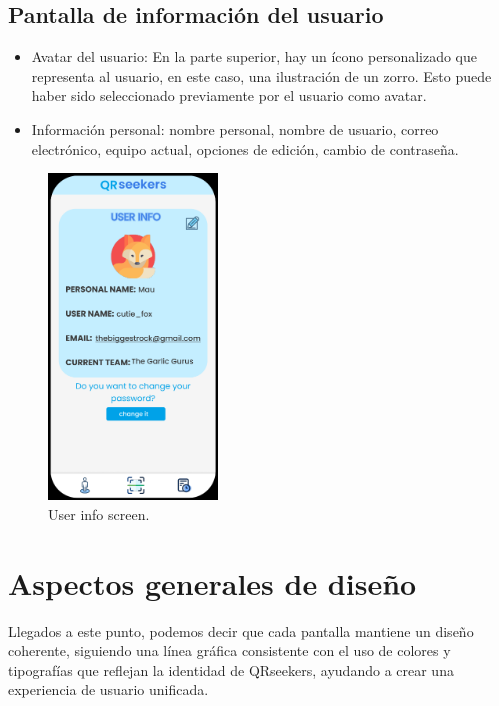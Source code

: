 \documentclass[letterpaper, 12pt]{report}
\begin{document}
\subsection{Pantalla de información del usuario}

\begin{itemize}
    \item Avatar del usuario: En la parte superior, hay un ícono personalizado que representa al usuario, en este caso, una ilustración de un zorro. Esto puede haber sido seleccionado previamente por el usuario como avatar.
    \item Información personal: nombre personal, nombre de usuario, correo electrónico, equipo actual, opciones de edición, cambio de contraseña.
\end{itemize}

\begin{figure}[H]
\centering
\includegraphics[width=0.4\textwidth]{figure14.png}
\caption{User info screen.}
\label{fig:1}
\end{figure}

\newpage

\section{Aspectos generales de diseño}
Llegados a este punto, podemos decir que cada pantalla mantiene un diseño coherente, siguiendo una línea gráfica consistente con el uso de colores y tipografías que reflejan la identidad de QRseekers, ayudando a crear una experiencia de usuario unificada. 
\end{document}
